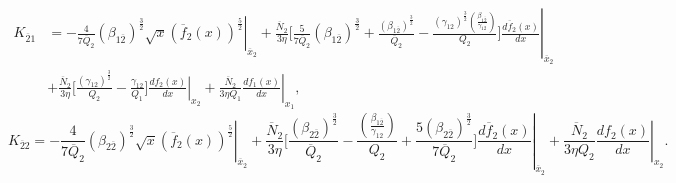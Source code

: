 \documentclass[fleqn]{article}
\begin{document}
            \begin{equation}
                \begin{split}
                    K_{\overline{2}1}  &= -  \left.\frac{4}{7\overline{Q}_{2}} (\beta_{1\overline{2}})^\frac{3}{2} \sqrt{x} (\overline{f}_{2}(x))^\frac{5}{2} \right|_{\overline{x}_{2}} + \frac{\overline{N}_{2}}{3 \eta} \Biggl[ \frac{5}{7 \overline{Q}_{2}} (\beta_{1\overline{2}})^\frac{3}{2}+ \left. \frac{(\beta_{1\overline{2}})^\frac{3}{2}}{\overline{Q}_{2}} - \frac{(\gamma_{12})^\frac{3}{2} \left(\frac{\beta_{1\overline{2}}}{\gamma_{12}}\right)}{Q_{2}} \Biggr] \frac{d\overline{f}_{2}(x)}{dx}\right|_{\overline{x}_{2}}  \\ & +   \frac{\overline{N}_{2}}{3 \eta}  \Biggl[\frac{(\gamma_{12})^\frac{3}{2}}{Q_2}  - \left. \frac{\gamma_{12}}{Q_1} \Biggr] \frac{df_2(x)}{dx} \right|_{x_2}  + \left. \frac{\overline{N}_{2}}{3 \eta Q_1} \frac{df_1(x)}{dx} \right|_{x_1},
                \end{split}
            \label{eqn:k2bar1_caseI}
            \end{equation}       
            \begin{equation}
            K_{\overline{2}2} = - \left. \frac{4}{7\overline{Q}_{2}}(\beta_{2\overline{2}})^\frac{3}{2}\sqrt{x}(\overline{f}_{2}(x))^\frac{5}{2}\right|_{\overline{x}_{2}}+\frac{\overline{N}_{2}}{3\eta} \biggl[\frac{(\beta_{2\overline{2}})^\frac{3}{2}}{\overline{Q}_{2}}-\frac{\left(\frac{\beta_{1\overline{2}}}{\gamma_{12}}\right)}{Q_2} +\left. \frac{5(\beta_{2\overline{2}})^\frac{3}{2}}{7\overline{Q}_{2}}\biggr]\frac{d\overline{f}_{2}(x)}{dx}\right|_{\overline{x}_{2}} + \left. \frac{\overline{N}_{2}}{3\eta Q_2} \frac{df_2(x)}{dx}\right|_{x_2}.
            \label{eqn:k2bar2_caseI}
            \end{equation}
\end{document}
